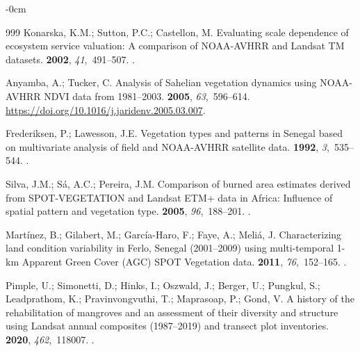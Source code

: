 \documentclass[earth,article,accept,pdftex,moreauthors]{Definitions/mdpi}
\begin{document}
{\begin{adjustwidth}{-\extralength}{0cm}
\begin{thebibliography}{999}
Konarska, K.M.; Sutton, P.C.; Castellon, M.
\newblock Evaluating scale dependence of ecosystem service valuation: A
  comparison of NOAA-AVHRR and Landsat TM datasets.
 {\bf 2002}, {\em 41},~491--507.
.

Anyamba, A.; Tucker, C.
\newblock Analysis of Sahelian vegetation dynamics using NOAA-AVHRR NDVI data
  from 1981–2003.
 {\bf 2005}, {\em 63},~596--614. %
  {\url{https://doi.org/10.1016/j.jaridenv.2005.03.007}}.

Frederiksen, P.; Lawesson, J.E.
\newblock Vegetation types and patterns in Senegal based on multivariate
  analysis of field and NOAA-AVHRR satellite data.
 {\bf 1992}, {\em 3},~535--544.
.

Silva, J.M.; Sá, A.C.; Pereira, J.M.
\newblock Comparison of burned area estimates derived from SPOT-VEGETATION and
  Landsat ETM+ data in Africa: Influence of spatial pattern and vegetation
  type.
 {\bf 2005}, {\em 96},~188--201.
.

Martínez, B.; Gilabert, M.; García-Haro, F.; Faye, A.; Meliá, J.
\newblock Characterizing land condition variability in Ferlo, Senegal
  (2001–2009) using multi-temporal 1-km Apparent Green Cover (AGC) SPOT
  Vegetation data.
 {\bf 2011}, {\em 76},~152--165.
.

Pimple, U.; Simonetti, D.; Hinks, I.; Oszwald, J.; Berger, U.; Pungkul, S.;
  Leadprathom, K.; Pravinvongvuthi, T.; Maprasoap, P.; Gond, V.
\newblock A history of the rehabilitation of mangroves and an assessment of
  their diversity and structure using Landsat annual composites (1987–2019)
  and transect plot inventories.
 {\bf 2020}, {\em 462},~118007.
.


\end{thebibliography}
\end{adjustwidth}}
\end{document}
